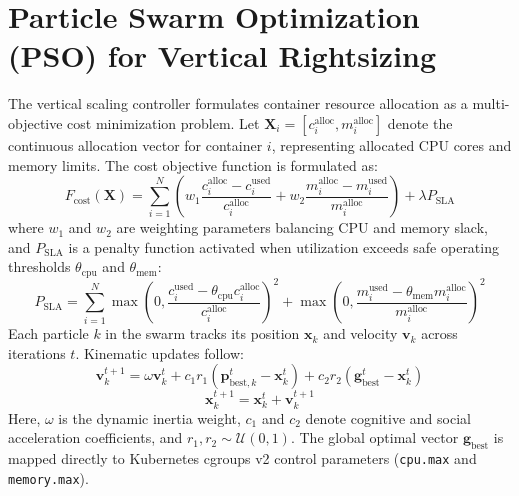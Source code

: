 \documentclass[12pt,a4paper]{report}
\begin{document}
	\section{Particle Swarm Optimization (PSO) for Vertical Rightsizing}
	The vertical scaling controller formulates container resource allocation as a multi-objective cost minimization problem. Let $\mathbf{X}_i = [c_i^{\text{alloc}}, m_i^{\text{alloc}}]$ denote the continuous allocation vector for container $i$, representing allocated CPU cores and memory limits. The cost objective function is formulated as:
	\begin{equation}
		F_{\text{cost}}(\mathbf{X}) = \sum_{i=1}^N \left( w_1 \frac{c_i^{\text{alloc}} - c_i^{\text{used}}}{c_i^{\text{alloc}}} + w_2 \frac{m_i^{\text{alloc}} - m_i^{\text{used}}}{m_i^{\text{alloc}}} \right) + \lambda P_{\text{SLA}}
	\end{equation}
	where $w_1$ and $w_2$ are weighting parameters balancing CPU and memory slack, and $P_{\text{SLA}}$ is a penalty function activated when utilization exceeds safe operating thresholds $\theta_{\text{cpu}}$ and $\theta_{\text{mem}}$:
	\begin{equation}
		P_{\text{SLA}} = \sum_{i=1}^N \max\left(0, \frac{c_i^{\text{used}} - \theta_{\text{cpu}} c_i^{\text{alloc}}}{c_i^{\text{alloc}}}\right)^2 + \max\left(0, \frac{m_i^{\text{used}} - \theta_{\text{mem}} m_i^{\text{alloc}}}{m_i^{\text{alloc}}}\right)^2
	\end{equation}
	Each particle $k$ in the swarm tracks its position $\mathbf{x}_k$ and velocity $\mathbf{v}_k$ across iterations $t$. Kinematic updates follow:
	\begin{equation}
		\mathbf{v}_k^{t+1} = \omega \mathbf{v}_k^t + c_1 r_1 (\mathbf{p}_{\text{best},k}^t - \mathbf{x}_k^t) + c_2 r_2 (\mathbf{g}_{\text{best}}^t - \mathbf{x}_k^t)
	\end{equation}
	\begin{equation}
		\mathbf{x}_k^{t+1} = \mathbf{x}_k^t + \mathbf{v}_k^{t+1}
	\end{equation}
	Here, $\omega$ is the dynamic inertia weight, $c_1$ and $c_2$ denote cognitive and social acceleration coefficients, and $r_1, r_2 \sim \mathcal{U}(0,1)$. The global optimal vector $\mathbf{g}_{\text{best}}$ is mapped directly to Kubernetes cgroups v2 control parameters (\texttt{cpu.max} and \texttt{memory.max}).
	
\end{document}
